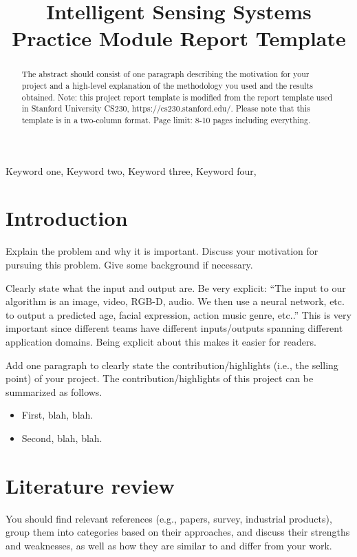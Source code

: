\documentclass{article}
\title{Intelligent Sensing Systems Practice Module Report Template}
\begin{document}
%
\maketitle
%

\begin{abstract}

The abstract should consist of one paragraph describing the motivation for your project and a high-level explanation of the methodology you used and the results obtained. Note: this project report template is modified from the report template used in Stanford University CS230, https://cs230.stanford.edu/. Please note that this template is in a two-column format. Page limit: 8-10 pages including everything.

\end{abstract}
%

\begin{keywords}
Keyword one, Keyword two, Keyword three, Keyword four,
\end{keywords}
%
\section{Introduction}
\label{sec:intro}

Explain the problem and why it is important. Discuss your motivation for pursuing this problem. Give some background if necessary.

Clearly state what the input and output are. Be very explicit: “The input to our algorithm is an {image, video, RGB-D, audio}. We then use a {neural network, etc.} to output a predicted {age, facial expression, action music genre, etc.}.” This is very important since different teams have different inputs/outputs spanning different application domains. Being explicit about this makes it easier for readers.

Add one paragraph to clearly state the contribution/highlights (i.e., the selling point) of your project. The contribution/highlights of this project can be summarized as follows.
\begin{itemize}
\item First, blah, blah.
\item Second, blah, blah.
\end{itemize}

\section{Literature review}
You should find relevant references (e.g., papers, survey, industrial products), group them into categories based on their approaches, and discuss their strengths and weaknesses, as well as how they are similar to and differ from your work.
\end{document}
